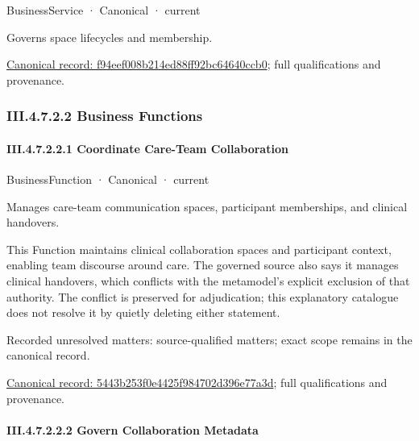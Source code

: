 \label{element:f94eef008b214ed88ff92bc64640ccb0}
{\small BusinessService · Canonical · current}\par

Governs space lifecycles and membership.


{\footnotesize \href{../../../../../../../continuum/business/business-service/f94eef008b214ed88ff92bc64640ccb0.md}{Canonical record: f94eef008b214ed88ff92bc64640ccb0}; full qualifications and provenance.}\par
\subsubsection*{III.4.7.2.2 Business Functions}
\label{navigation:III.4.7.2.2}

\paragraph*{III.4.7.2.2.1 Coordinate Care-Team Collaboration}
\label{navigation:III.4.7.2.2.1}

\label{element:5443b253f0e4425f984702d396e77a3d}
{\small BusinessFunction · Canonical · current}\par

Manages care-team communication spaces, participant memberships, and clinical handovers.



This Function maintains clinical collaboration spaces and participant context, enabling team discourse around care. The governed source also says it manages clinical handovers, which conflicts with the metamodel's explicit exclusion of that authority. The conflict is preserved for adjudication; this explanatory catalogue does not resolve it by quietly deleting either statement.


{\small Recorded unresolved matters: source-qualified matters; exact scope remains in the canonical record.}\par
{\footnotesize \href{../../../../../../../continuum/business/business-function/5443b253f0e4425f984702d396e77a3d.md}{Canonical record: 5443b253f0e4425f984702d396e77a3d}; full qualifications and provenance.}\par
\paragraph*{III.4.7.2.2.2 Govern Collaboration Metadata}
\label{navigation:III.4.7.2.2.2}

